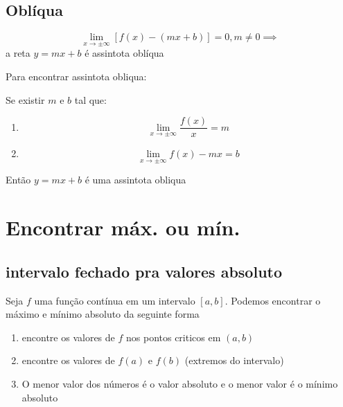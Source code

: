 \subsection{Oblíqua}

\begin{definition}
    \begin{equation}
        \lim_{x \to \pm \infty} [f(x) - (mx + b)] = 0, m \neq 0 \implies 
    \end{equation}
    \centering
    a reta \( y = mx + b\) é assintota oblíqua
\end{definition}
Para encontrar assintota obliqua:
\begin{method}
    Se existir \(m\) e \(b\) tal que:
    \begin{enumerate}
        \item 
            \begin{equation}
                \lim_{x \to \pm \infty}  \frac{f(x)}{x} = m
            \end{equation}
        \item
            \begin{equation}
                \lim_{x \to \pm \infty}  f(x) - mx = b
            \end{equation}
    \end{enumerate}
    Então
    \(y = mx + b\) é uma assintota obliqua
\end{method}

\section{Encontrar máx. ou mín.}

\subsection{intervalo fechado pra valores absoluto}

\begin{method}
    Seja \(f\) uma função contínua em um intervalo \([a,b]\).
    Podemos encontrar o máximo e mínimo absoluto da seguinte forma
    
    \begin{enumerate}
        \item encontre os valores de \(f\) nos pontos criticos em \((a,b)\)
        \item encontre os valores de \(f(a)\) e \(f(b)\) (extremos do intervalo)
        \item O menor valor dos números é o valor absoluto e o menor valor é o mínimo absoluto
        
    \end{enumerate}    
\end{method}



